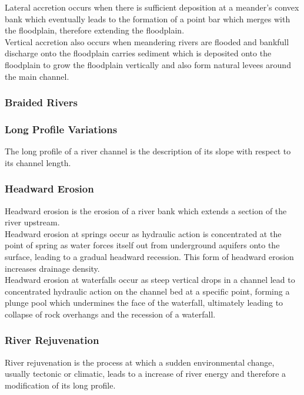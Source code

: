 \documentclass[../../main]{subfiles}
\begin{document}
	Lateral accretion occurs when there is sufficient deposition at a meander's convex bank which eventually leads to the formation of a point bar which merges with the floodplain, therefore extending the floodplain. \\

	Vertical accretion also occurs when meandering rivers are flooded and bankfull discharge onto the floodplain carries sediment which is deposited onto the floodplain to grow the floodplain vertically and also form natural levees around the main channel.

\subsubsection{Braided Rivers}

\subsubsection{Long Profile Variations}

	The long profile of a river channel is the description of its slope with respect to its channel length.

\subsubsection{Headward Erosion}

	Headward erosion is the erosion of a river bank which extends a section of the river upstream. \\

	Headward erosion at springs occur as hydraulic action is concentrated at the point of spring as water forces itself out from underground aquifers onto the surface, leading to a gradual headward recession. This form of headward erosion increases drainage density. \\

	Headward erosion at waterfalls occur as steep vertical drops in a channel lead to concentrated hydraulic action on the channel bed at a specific point, forming a plunge pool which undermines the face of the waterfall, ultimately leading to collapse of rock overhangs and the recession of a waterfall.

\subsubsection{River Rejuvenation}

	River rejuvenation is the process at which a sudden environmental change, usually tectonic or climatic, leads to a increase of river energy and therefore a modification of its long profile.
\end{document}
